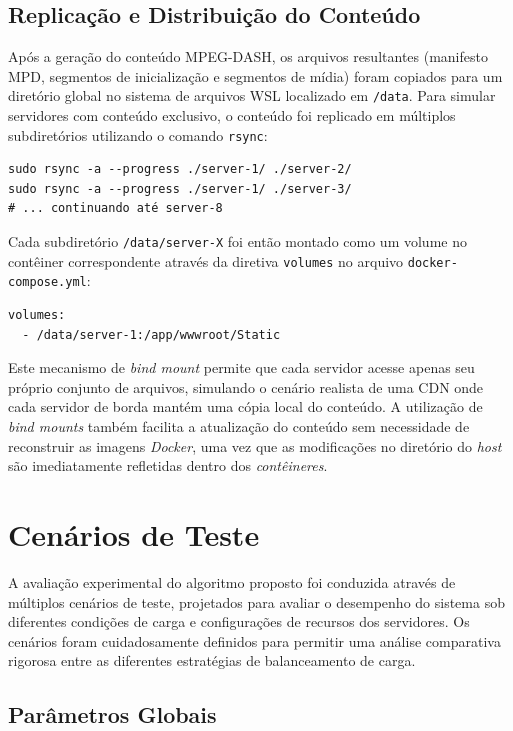 \subsection{Replicação e Distribuição do Conteúdo}

Após a geração do conteúdo MPEG-DASH, os arquivos resultantes (manifesto MPD, segmentos de inicialização e segmentos de mídia) foram copiados para um diretório global no sistema de arquivos WSL localizado em \texttt{/data}. Para simular servidores com conteúdo exclusivo, o conteúdo foi replicado em múltiplos subdiretórios utilizando o comando \texttt{rsync}:

\begin{verbatim}
sudo rsync -a --progress ./server-1/ ./server-2/
sudo rsync -a --progress ./server-1/ ./server-3/
# ... continuando até server-8
\end{verbatim}

Cada subdiretório \texttt{/data/server-X} foi então montado como um volume no contêiner correspondente através da diretiva \texttt{volumes} no arquivo \texttt{docker-compose.yml}:

\begin{verbatim}
volumes:
  - /data/server-1:/app/wwwroot/Static
\end{verbatim}

Este mecanismo de \textit{bind mount} permite que cada servidor acesse apenas seu próprio conjunto de arquivos, simulando o cenário realista de uma CDN onde cada servidor de borda mantém uma cópia local do conteúdo. A utilização de \textit{bind mounts} também facilita a atualização do conteúdo sem necessidade de reconstruir as imagens \textit{Docker}, uma vez que as modificações no diretório do \textit{host} são imediatamente refletidas dentro dos \textit{contêineres}.

\section{Cenários de Teste}

A avaliação experimental do algoritmo proposto foi conduzida através de múltiplos cenários de teste, projetados para avaliar o desempenho do sistema sob diferentes condições de carga e configurações de recursos dos servidores. Os cenários foram cuidadosamente definidos para permitir uma análise comparativa rigorosa entre as diferentes estratégias de balanceamento de carga.

\subsection{Parâmetros Globais}

